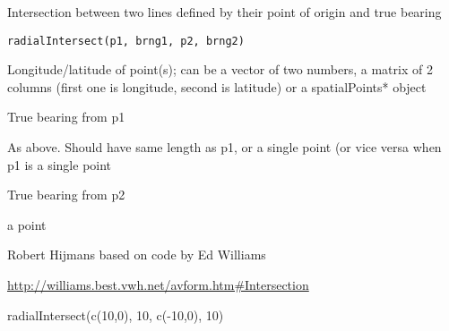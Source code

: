 \begin{Description}\relax
Intersection between two lines defined by their point of origin and true bearing
\end{Description}
\begin{Usage}
\begin{verbatim}
radialIntersect(p1, brng1, p2, brng2) 
\end{verbatim}
\end{Usage}
\begin{Arguments}
\begin{ldescription}
\item[\code{p1}] Longitude/latitude of point(s); can be a vector of two numbers, a matrix of 2 columns (first one is longitude, second is latitude) or a spatialPoints* object
\item[\code{brng1}] True bearing from p1
\item[\code{p2}] As above. Should have same length as p1, or a single point (or vice versa when p1 is a single point
\item[\code{brng2}] True bearing from p2
\end{ldescription}
\end{Arguments}
\begin{Value}
a point
\end{Value}
\begin{Author}\relax
Robert Hijmans based on code by Ed Williams
\end{Author}
\begin{References}\relax
\url{http://williams.best.vwh.net/avform.htm#Intersection}
\end{References}
\begin{Examples}
\begin{ExampleCode}
radialIntersect(c(10,0), 10, c(-10,0), 10)
\end{ExampleCode}
\end{Examples}

